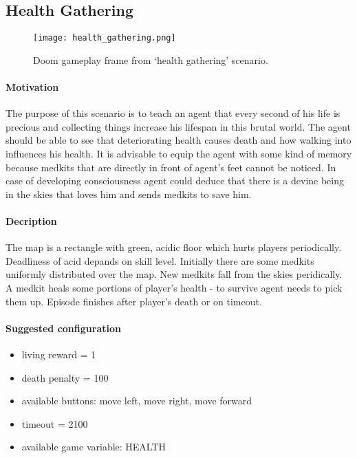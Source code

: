 	\subsection{Health Gathering}
		\begin{figure}
			\centering
			\texttt{[image: health\_gathering.png]}
			\caption{Doom gameplay frame from `health gathering' scenario.}\label{fig:health_gathering}
		\end{figure}
		\paragraph{Motivation}
			The purpose of this scenario is to teach an agent that every second of his life is precious and collecting things increase his lifespan in this brutal world. The agent should be able to see that deteriorating health causes death and how walking into influences his health. It is advisable to equip the agent with some kind of memory because medkits that are directly in front of agent's feet cannot be noticed. In case of developing consciousness agent could deduce that there is a devine being in the skies that loves him and sends medkits to save him.

		\paragraph{Decription}
			The map is a rectangle with green, acidic floor which hurts players periodically. Deadliness of acid depands on skill level. Initially there are some medkits uniformly distributed over the map. New medkits fall from the skies peridically. A medkit heals some portions of player's health - to survive agent needs to pick them up. Episode finishes after player's death or on timeout.

		\paragraph{Suggested configuration}
		\begin{itemize}
			\item living reward = 1
			\item death penalty = 100
			\item available buttons: move left, move right, move forward
			\item timeout = 2100
			\item available game variable: HEALTH
		\end{itemize}
	\newpage

